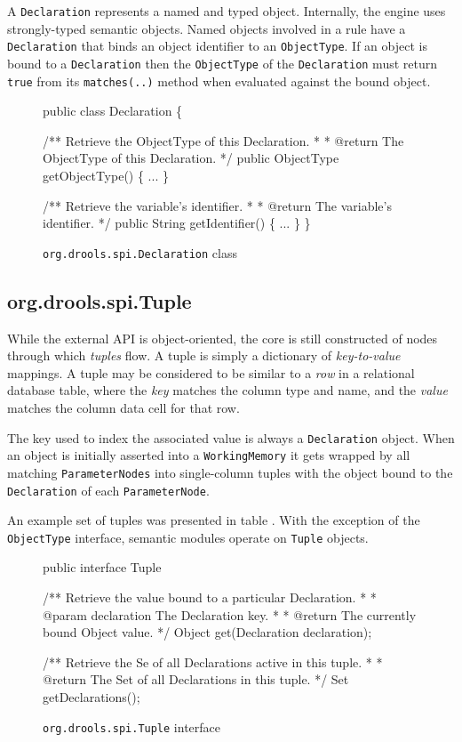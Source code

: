 A \verb|Declaration| represents a named and typed object.  Internally,
the \drools{} engine uses strongly-typed semantic objects.  Named objects
involved in a rule have a \verb|Declaration| that binds an object
identifier to an \verb|ObjectType|.  If an object is bound to a
\verb|Declaration| then the \verb|ObjectType| of the \verb|Declaration|
must return \verb|true| from its \verb|matches(..)| method when
evaluated against the bound object.

\begin{figure}
\begin{codelisting}
public class Declaration
\{

    /** Retrieve the ObjectType of this Declaration.
     *
     *  @return The ObjectType of this Declaration.
     */
    public ObjectType getObjectType() \{ ... \}

    /** Retrieve the variable's identifier.
     *
     *  @return The variable's identifier.
     */
    public String getIdentifier() \{ ... \}
\}
\end{codelisting}
\label{code.Declaration}
\caption{\texttt{org.drools.spi.Declaration} class}
\end{figure}

\subsection{org.drools.spi.Tuple}

While the external \drools{} API is object-oriented, the core is still
constructed of nodes through which \emph{tuples} flow.  A tuple is
simply a dictionary of \emph{key-to-value} mappings.  A
tuple may be considered to be similar to a \emph{row} in a relational
database table, where the \emph{key} matches the column type and name, and
the \emph{value} matches the column data cell for that row.  

The key used to index the associated value is always a
\verb|Declaration| object. When an object is initially asserted into a
\verb|WorkingMemory| it gets wrapped by all matching \verb|ParameterNodes|
into single-column tuples with the object bound to the
\verb|Declaration| of each \verb|ParameterNode|.

An example set of tuples was presented in table
. With the exception of the \verb|ObjectType|
interface, semantic modules operate on \verb|Tuple| objects. 

\begin{figure}
\begin{codelisting}
public interface Tuple
{
    /** Retrieve the value bound to a particular Declaration.
     *
     *  @param declaration The Declaration key.
     *
     *  @return The currently bound Object value.
     */
    Object get(Declaration declaration);

    /** Retrieve the Se of all Declarations active in this tuple.
     *
     *  @return The Set of all Declarations in this tuple.
     */
    Set getDeclarations();
}
\end{codelisting}
\label{code.Tuple}
\caption{\texttt{org.drools.spi.Tuple} interface}
\end{figure}

